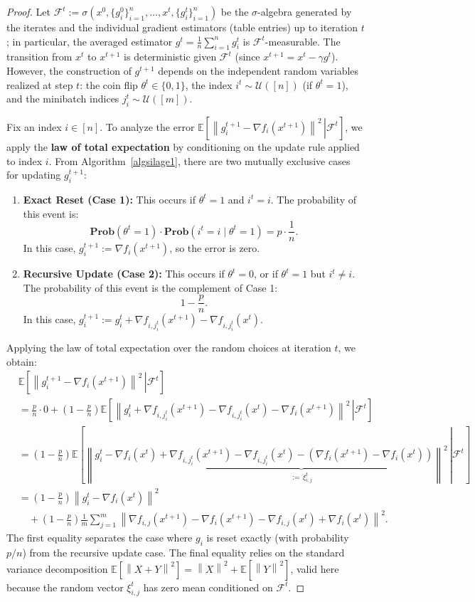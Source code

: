 \documentclass{article}
\newcommand{\bb}{\mathbb}
\newcommand{\sqn}[1]{\left\| #1 \right\|^2}
\newcommand{\eqdef}{:=}
\newcommand{\Prob}{\mathbf{Prob}}
\newcommand{\Exp}[1]{{\bb E}\left[#1\right]}
\newcommand{\Expb}[2]{\mathbb{E}\!\left[\left. #1\,\right|#2 \right]}
\newcommand{\Expc}[1]{\Expb{#1}{\mathcal{F}^t}}
\newcommand{\rb}[1]{\left(#1\right)}
\theoremstyle{plain}
\begin{document}
\begin{proof}
Let $\mathcal{F}^t \eqdef \sigma\rb{x^0, \{g_i^0\}_{i=1}^n, \dots, x^t, \{g_i^t\}_{i=1}^n}$ be the $\sigma$-algebra generated by the iterates and the individual gradient estimators (table entries) up to iteration $t$; in particular, the averaged estimator $g^t = \frac{1}{n}\sum_{i=1}^n g_i^t$ is $\mathcal{F}^t$-measurable. The transition from $x^t$ to $x^{t+1}$ is deterministic given $\mathcal{F}^t$ (since $x^{t+1} = x^t - \gamma g^t$). However, the construction of $g^{t+1}$ depends on the independent random variables realized at step $t$: the coin flip $\theta^t \in \{0,1\}$, the index $i^t \sim \mathcal{U}([n])$ (if $\theta^t=1$), and the minibatch indices $j_i^t \sim \mathcal{U}([m])$.

Fix an index $i \in [n]$. To analyze the error $\Expc{\sqn{g_i^{t+1}-\nabla f_i(x^{t+1})}}$, we apply the \textbf{law of total expectation} by conditioning on the update rule applied to index $i$. From Algorithm~\ref{algsilage1}, there are two mutually exclusive cases for updating $g_i^{t+1}$:
\begin{enumerate}
    \item \textbf{Exact Reset (Case 1):} This occurs if $\theta^t = 1$ and $i^t = i$. The probability of this event is:
    $$ \Prob(\theta^t=1) \cdot \Prob(i^t=i \mid \theta^t=1) = p \cdot \frac{1}{n}. $$
    In this case, $g_i^{t+1} \eqdef \nabla f_i(x^{t+1})$, so the error is zero.
    
    \item \textbf{Recursive Update (Case 2):} This occurs if $\theta^t = 0$, or if $\theta^t = 1$ but $i^t \neq i$. The probability of this event is the complement of Case 1:
    $$ 1 - \frac{p}{n}. $$
    In this case, $g_i^{t+1} \eqdef g_i^t + \nabla f_{i, j_i^t}(x^{t+1}) - \nabla f_{i, j_i^t}(x^t)$.
\end{enumerate}

Applying the law of total expectation over the random choices at iteration $t$, we obtain:
\begin{align*}
&\Expc{\sqn{g_i^{t+1}-\nabla f_i(x^{t+1})}} \\
&= \frac{p}{n} \cdot 0 + \left(1 - \frac{p}{n}\right) \Expb{\sqn{g_i^t + \nabla f_{i, j_i^t}(x^{t+1}) - \nabla f_{i, j_i^t}(x^t) - \nabla f_i(x^{t+1})}}{\mathcal{F}^t} \\
&= \left(1 - \frac{p}{n}\right) \Expb{\left\|g_i^t - \nabla f_i(x^t) + \underbrace{\nabla f_{i, j_i^t}(x^{t+1}) - \nabla f_{i, j_i^t}(x^t) - (\nabla f_i(x^{t+1}) - \nabla f_i(x^t))}_{:=\, \xi_{i,j}^t}\right\|^2}{\mathcal{F}^t} \\
&= \left(1-\frac{p}{n}\right) \sqn{g_i^{t}-\nabla f_i(x^{t})}\\
&\quad+\left(1-\frac{p}{n}\right)\frac{1}{m}\sum_{j=1}^m \sqn{\nabla f_{i,j}(x^{t+1})-\nabla f_i(x^{t+1})-\nabla f_{i,j}(x^{t})+\nabla f_i(x^{t})}.
\end{align*}
The first equality separates the case where $g_i$ is reset exactly (with probability $p/n$) from the recursive update case. The final equality relies on the standard variance decomposition $\Exp{\sqn{X+Y}} = \sqn{X} + \Exp{\sqn{Y}}$, valid here because the random vector $\xi_{i,j}^t$ has zero mean conditioned on $\mathcal{F}^t$.


\end{proof}
\end{document}

